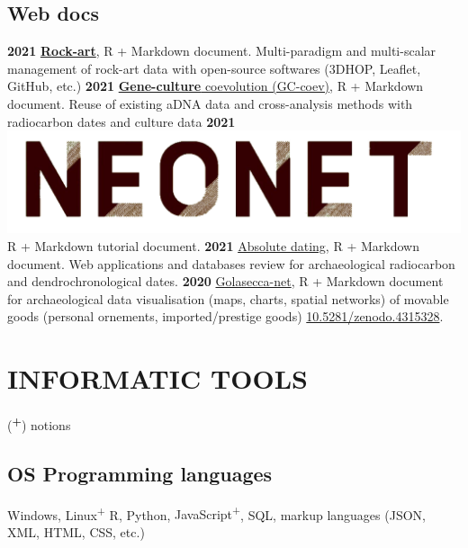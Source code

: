 \documentclass{article}
\begin{document}
\subsection*{Web docs}

\textbf{2021 }\href{https://zoometh.github.io/rockart/}{\textbf{Rock-art}}, \textsf{R} + \textsf{Markdown} document. Multi-paradigm and multi-scalar management of rock-art data with open-source softwares (\textsf{3DHOP}, \textsf{Leaflet}, \textsf{GitHub}, etc.)
\smallbreak
\textbf{2021 }\href{https://zoometh.github.io/aDNA/}{\textbf{Gene-culture} coevolution (GC-coev)}, \textsf{R} + \textsf{Markdown} document. Reuse of existing aDNA data and cross-analysis methods with radiocarbon dates and culture data
\smallbreak
\textbf{2021 }\href{https://zoometh.github.io/C14/neonet/}{\includegraphics[scale=0.04]{neonet}} \textsf{R} + \textsf{Markdown} tutorial document. 
\smallbreak
\textbf{2021 }\href{https://neolithic.shinyapps.io/AbsoluteDating/}{Absolute dating}, \textsf{R} + \textsf{Markdown} document. Web applications and databases review for archaeological radiocarbon and dendrochronological dates.
\smallbreak
\textbf{2020 }\href{https://zoometh.github.io/golasecca/}{Golasecca-net}, \textsf{R} + \textsf{Markdown} document for archaeological data visualisation (maps, charts, spatial networks) of movable goods (personal ornements, imported/prestige goods) \href{https://doi.org/10.5281/zenodo.4315328}{10.5281/zenodo.4315328}.

\section{INFORMATIC TOOLS}
\begin{center}(\textbf{\textsuperscript{+}}) notions \end{center}
\smallbreak

\subsection*{OS {\textbar} Programming languages}

Windows, Linux\textsuperscript{+} \textbf{{\textbar}} \textsf{R}, \textsf{Python}, \textsf{JavaScript\textsuperscript{+}}, SQL, markup languages (JSON, XML, HTML, CSS, etc.)
\end{document}
